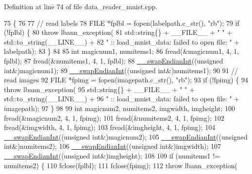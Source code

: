 Definition at line 74 of file data\+\_\+reader\+\_\+mnist.\+cpp.


\begin{DoxyCode}
75                                                                            \{
76 
77   \textcolor{comment}{// read labels}
78   FILE *fplbl = fopen(labelpath.c\_str(), \textcolor{stringliteral}{"rb"});
79   \textcolor{keywordflow}{if} (!fplbl) \{
80     \textcolor{keywordflow}{throw} lbann\_exception(
81       std::string\{\} + \_\_FILE\_\_ + \textcolor{stringliteral}{" "} + std::to\_string(\_\_LINE\_\_) +
82       \textcolor{stringliteral}{" :: load\_mnist\_data: failed to open file: "} + labelpath);
83   \}
84 
85   \textcolor{keywordtype}{int} magicnum1, numitems1;
86   fread(&magicnum1, 4, 1, fplbl);
87   fread(&numitems1, 4, 1, fplbl);
88   \hyperlink{namespacelbann_a0fd8bc0ad31da913a124683f5ec4fdf1}{\_\_swapEndianInt}((\textcolor{keywordtype}{unsigned} \textcolor{keywordtype}{int}&)magicnum1);
89   \hyperlink{namespacelbann_a0fd8bc0ad31da913a124683f5ec4fdf1}{\_\_swapEndianInt}((\textcolor{keywordtype}{unsigned} \textcolor{keywordtype}{int}&)numitems1);
90 
91   \textcolor{comment}{// read images}
92   FILE *fpimg = fopen(imagepath.c\_str(), \textcolor{stringliteral}{"rb"});
93   \textcolor{keywordflow}{if} (!fpimg) \{
94     \textcolor{keywordflow}{throw} lbann\_exception(
95       std::string\{\} + \_\_FILE\_\_ + \textcolor{stringliteral}{" "} + std::to\_string(\_\_LINE\_\_) +
96       \textcolor{stringliteral}{" :: load\_mnist\_data: failed to open file: "} + imagepath);
97   \}
98 
99   \textcolor{keywordtype}{int} magicnum2, numitems2, imgwidth, imgheight;
100   fread(&magicnum2, 4, 1, fpimg);
101   fread(&numitems2, 4, 1, fpimg);
102   fread(&imgwidth, 4, 1, fpimg);
103   fread(&imgheight, 4, 1, fpimg);
104   \hyperlink{namespacelbann_a0fd8bc0ad31da913a124683f5ec4fdf1}{\_\_swapEndianInt}((\textcolor{keywordtype}{unsigned} \textcolor{keywordtype}{int}&)magicnum2);
105   \hyperlink{namespacelbann_a0fd8bc0ad31da913a124683f5ec4fdf1}{\_\_swapEndianInt}((\textcolor{keywordtype}{unsigned} \textcolor{keywordtype}{int}&)numitems2);
106   \hyperlink{namespacelbann_a0fd8bc0ad31da913a124683f5ec4fdf1}{\_\_swapEndianInt}((\textcolor{keywordtype}{unsigned} \textcolor{keywordtype}{int}&)imgwidth);
107   \hyperlink{namespacelbann_a0fd8bc0ad31da913a124683f5ec4fdf1}{\_\_swapEndianInt}((\textcolor{keywordtype}{unsigned} \textcolor{keywordtype}{int}&)imgheight);
108 
109   \textcolor{keywordflow}{if} (numitems1 != numitems2) \{
110     fclose(fplbl);
111     fclose(fpimg);
112     \textcolor{keywordflow}{throw} lbann\_exception(

\end{DoxyCode}
